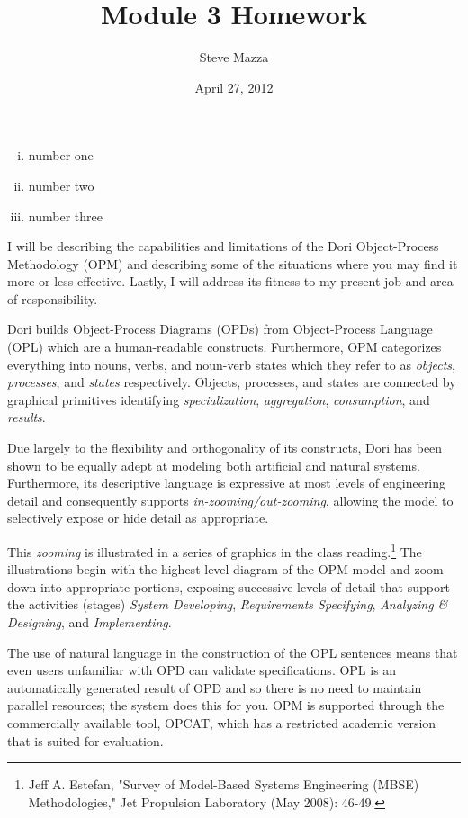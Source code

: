 \documentclass[letterpaper,12pt]{article}
\title{Module 3 Homework}
\author{Steve Mazza}
\date{April 27, 2012}
\begin{document}
\maketitle

\begin{enumerate}[i)]
\item number one
\item number two
\item number three
\end{enumerate}

I will be describing the capabilities and limitations of the Dori Object-Process Methodology (OPM) and describing some of the situations where you may find it more or less effective.  Lastly, I will address its fitness to my present job and area of responsibility.

Dori builds Object-Process Diagrams (OPDs) from Object-Process Language (OPL) which are a human-readable constructs.  Furthermore, OPM categorizes everything into nouns, verbs, and noun-verb states which they refer to as \emph{objects}, \emph{processes}, and \emph{states} respectively.  Objects, processes, and states are connected by graphical primitives identifying \emph{specialization}, \emph{aggregation}, \emph{consumption}, and \emph{results}.

Due largely to the flexibility and orthogonality of its constructs, Dori has been shown to be equally adept at modeling both artificial and natural systems.  Furthermore, its descriptive language is expressive at most levels of engineering detail and consequently supports \emph{in-zooming/out-zooming}, allowing the model to selectively expose or hide detail as appropriate.

This \emph{zooming} is illustrated in a series of graphics in the class reading.\footnote{Jeff A. Estefan, "Survey of Model-Based Systems Engineering (MBSE) 
Methodologies," Jet Propulsion Laboratory (May 2008): 46-49.}  The illustrations begin with the highest level diagram of the OPM model and zoom down into appropriate portions, exposing successive levels of detail that support the activities (stages) \emph{System Developing}, \emph{Requirements Specifying}, \emph{Analyzing \& Designing}, and \emph{Implementing}.

The use of natural language in the construction of the OPL sentences means that even users unfamiliar with OPD can validate specifications.  OPL is an automatically generated result of OPD and so there is no need to maintain parallel resources; the system does this for you.  OPM is supported through the commercially available tool, OPCAT, which has a restricted academic version that is suited for evaluation.
\end{document}
